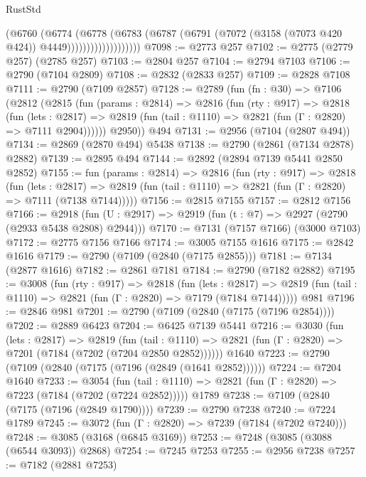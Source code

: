 \begin{lexlean}{RustStd}
\begin{coremodule}
{\begin{coremodule}
{{{{{{{{{{{{{{{{{{{{{{{{{{                            (@6760
                              (@6774
                                (@6778
                                  (@6783
                                    (@6787
                                      (@6791
                                        (@7072 (@3158 (@7073 @420 @424)) @4449)))))))))))))))))))
@7098 := @2773 @257
@7102 := @2775 (@2779 @257) (@2785 @257)
@7103 := @2804 @257
@7104 := @2794 @7103
@7106 := @2790 (@7104 @2809)
@7108 := @2832 (@2833 @257)
@7109 := @2828 @7108
@7111 := @2790 (@7109 @2857)
@7128 := @2789
    (fun (fn : @30) =>
    @7106
      (@2812
        (@2815
          (fun (params : @2814) =>
          @2816
            (fun (rty : @917) =>
            @2818
              (fun (lets : @2817) =>
              @2819 (fun (tail : @1110) => @2821 (fun (Γ : @2820) => @7111 @2904))))))
        @2950))
    @494
@7131 := @2956 (@7104 (@2807 @494))
@7134 := @2869 (@2870 @494) @5438
@7138 := @2790 (@2861 (@7134 @2878) @2882)
@7139 := @2895 @494
@7144 := @2892 (@2894 @7139 @5441 @2850 @2852)
@7155 := fun (params : @2814) =>
  @2816
    (fun (rty : @917) =>
    @2818
      (fun (lets : @2817) =>
      @2819 (fun (tail : @1110) => @2821 (fun (Γ : @2820) => @7111 (@7138 @7144)))))
@7156 := @2815 @7155
@7157 := @2812 @7156
@7166 := @2918 (fun (U : @2917) => @2919 (fun (t : @7) => @2927 (@2790 (@2933 @5438 @2808) @2944)))
@7170 := @7131 (@7157 @7166) (@3000 @7103)
@7172 := @2775 @7156 @7166
@7174 := @3005 @7155 @1616
@7175 := @2842 @1616
@7179 := @2790 (@7109 (@2840 (@7175 @2855)))
@7181 := @7134 (@2877 @1616)
@7182 := @2861 @7181
@7184 := @2790 (@7182 @2882)
@7195 := @3008
    (fun (rty : @917) =>
    @2818
      (fun (lets : @2817) =>
      @2819 (fun (tail : @1110) => @2821 (fun (Γ : @2820) => @7179 (@7184 @7144)))))
    @981
@7196 := @2846 @981
@7201 := @2790 (@7109 (@2840 (@7175 (@7196 @2854))))
@7202 := @2889 @6423
@7204 := @6425 @7139 @5441
@7216 := @3030
    (fun (lets : @2817) =>
    @2819
      (fun (tail : @1110) => @2821 (fun (Γ : @2820) => @7201 (@7184 (@7202 (@7204 @2850 @2852))))))
    @1640
@7223 := @2790 (@7109 (@2840 (@7175 (@7196 (@2849 (@1641 @2852))))))
@7224 := @7204 @1640
@7233 := @3054
    (fun (tail : @1110) => @2821 (fun (Γ : @2820) => @7223 (@7184 (@7202 (@7224 @2852)))))
    @1789
@7238 := @7109 (@2840 (@7175 (@7196 (@2849 @1790))))
@7239 := @2790 @7238
@7240 := @7224 @1789
@7245 := @3072 (fun (Γ : @2820) => @7239 (@7184 (@7202 @7240)))
@7248 := @3085 (@3168 (@6845 @3169))
@7253 := @7248 (@3085 (@3088 (@6544 @3093)) @2868)
@7254 := @7245 @7253
@7255 := @2956 @7238
@7257 := @7182 (@2881 @7253)
}}}}}}}}}}}}}}}}}}}}}}}}}}
\end{coremodule}}
\end{coremodule}
\end{lexlean}
